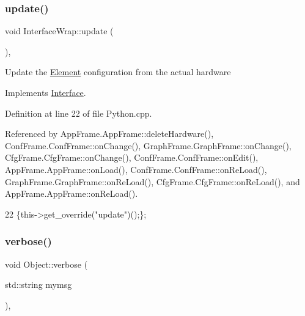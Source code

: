 \subsubsection{\texorpdfstring{update()}{update()}}
{\footnotesize\ttfamily void Interface\+Wrap\+::update (\begin{DoxyParamCaption}{ }\end{DoxyParamCaption})\hspace{0.3cm}{\ttfamily [inline]}, {\ttfamily [virtual]}}

Update the \hyperlink{classElement}{Element} configuration from the actual hardware 

Implements \hyperlink{classInterface_a30e71ffbe36091df9f7c0838dd4b60d2}{Interface}.



Definition at line 22 of file Python.\+cpp.



Referenced by App\+Frame.\+App\+Frame\+::delete\+Hardware(), Conf\+Frame.\+Conf\+Frame\+::on\+Change(), Graph\+Frame.\+Graph\+Frame\+::on\+Change(), Cfg\+Frame.\+Cfg\+Frame\+::on\+Change(), Conf\+Frame.\+Conf\+Frame\+::on\+Edit(), App\+Frame.\+App\+Frame\+::on\+Load(), Conf\+Frame.\+Conf\+Frame\+::on\+Re\+Load(), Graph\+Frame.\+Graph\+Frame\+::on\+Re\+Load(), Cfg\+Frame.\+Cfg\+Frame\+::on\+Re\+Load(), and App\+Frame.\+App\+Frame\+::on\+Re\+Load().


\begin{DoxyCode}
22 \{this->get\_override(\textcolor{stringliteral}{"update"})();\};
\end{DoxyCode}
\mbox{\label{classObject_a83d2db2df682907ea1115ad721c1c4a1}} 
\subsubsection{\texorpdfstring{verbose()}{verbose()}\hspace{0.1cm}{\footnotesize\ttfamily [1/2]}}
{\footnotesize\ttfamily void Object\+::verbose (\begin{DoxyParamCaption}\item[{std\+::string}]{mymsg }\end{DoxyParamCaption})\hspace{0.3cm}{\ttfamily [inline]}, {\ttfamily [inherited]}}



